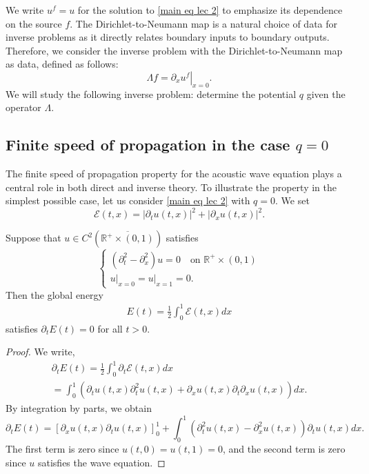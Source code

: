 \documentclass[12pt,oneside,final]{amsart}
\newcommand{\HOX}[1]{\todo[noline,color=white,size=\footnotesize]{#1}}
\def\R{\mathbb R}
\begin{document}
We write $u^f=u$ for the solution to \eqref{main eq lec 2} to emphasize its dependence on the source $f$. The Dirichlet-to-Neumann map is a natural choice of data for inverse problems as it directly relates boundary inputs to boundary outputs. Therefore, we consider the inverse problem with the Dirichlet-to-Neumann map as data, defined as follows:
\begin{equation}\label{DtN}
	\Lambda f = \left. \partial_x u^f \right|_{x=0}.
\end{equation}
We will study the following inverse problem: determine the potential $q$ given the operator $\Lambda$.

\subsection{Finite speed of propagation in the case $q = 0$}

The finite speed of propagation property for the acoustic wave equation plays a central role in both direct and inverse theory. 
To illustrate the property in the simplest possible case, let us 
consider \eqref{main eq lec 2} with $q = 0$.
We set
\begin{equation*}
	\mathcal{E}(t,x)  = |\partial_t u(t,x)|^2 + |\partial_x u(t,x)|^2.
\end{equation*}


\begin{theorem}
	Suppose that $u \in C^2(\overline{{\R}^+\times (0,1)})$ satisfies
	\begin{equation*}
		\begin{cases}
			(\partial_t^2 - \partial_x^2) u = 0 \quad \text{on } \mathbb{R}^+\times (0,1)\\
			\left.u\right|_{x=0} = 
\left.u\right|_{x=1} = 0.
		\end{cases}
	\end{equation*}
	Then the global energy
	\begin{align*}
		E(t) = \frac{1}{2} \int_{0}^{1} \mathcal{E}(t,x) dx
	\end{align*}
	satisfies $\partial_t E(t) = 0$ for all $t > 0$.
\end{theorem}
\begin{proof}
	We write,
	\begin{multline*}
		\partial_t E(t) =  \frac{1}{2} \int_{0}^{1} \partial_t \mathcal{E} (t,x)dx \\
		=  \int_{0}^{1}\left(  \partial_t u(t,x) \partial_t^2 u(t,x) + \partial_x u(t,x) \partial_{t}\partial_{x} u(t,x)\right) dx.
	\end{multline*}
	By integration by parts, we obtain
	\begin{equation*}
		\partial_t E(t) =  \left[\partial_x u(t,x)\partial_t u(t,x)\right]^{1}_{0}
		+ \int_{0}^{1} \left( \partial_t^2u(t,x) - \partial_x^2u(t,x)\right) \partial_t u(t,x) dx.
	\end{equation*}
	The first term is zero since $u(t,0) = u(t,1) = 0$, and the second term is zero since $u$ satisfies the wave equation.
\end{proof}
\end{document}
